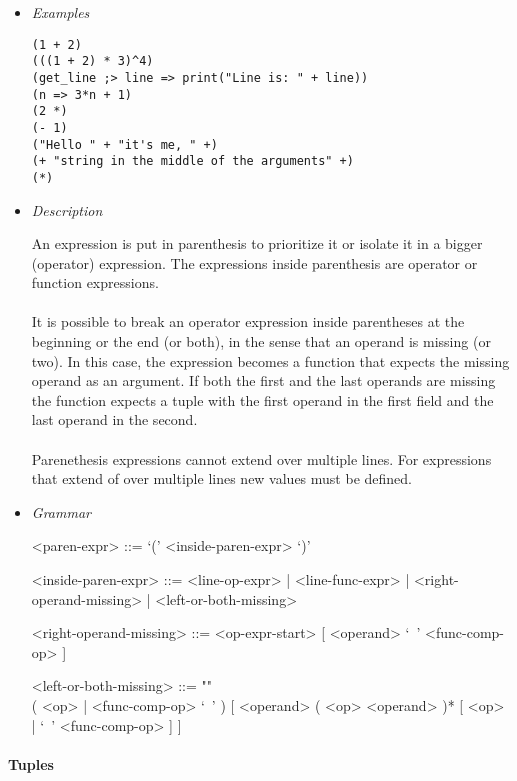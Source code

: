 \documentclass{article}
\begin{document}
\begin{itemize}

\item \textit{Examples}
\begin{verbatim}
(1 + 2)
(((1 + 2) * 3)^4)
(get_line ;> line => print("Line is: " + line))
(n => 3*n + 1)
(2 *)
(- 1)
("Hello " + "it's me, " +)
(+ "string in the middle of the arguments" +)
(*)
\end{verbatim}

\item \textit{Description}

An expression is put in parenthesis to prioritize it or isolate it in a bigger
(operator) expression. The expressions inside parenthesis are operator
or function expressions.
\\\\
It is possible to break an operator expression inside parentheses at the
beginning or the end (or both), in the sense that an operand is missing (or
two). In this case, the expression becomes a function that expects the missing
operand as an argument. If both the first and the last operands are missing 
the function expects a tuple with the first operand in the first field
and the last operand in the second.
\\\\
Parenethesis expressions cannot extend over multiple lines. For expressions
that extend of over multiple lines new values must be defined.

\item \textit{Grammar}
\begin{grammar}
<paren-expr> ::= `(' <inside-paren-expr> `)'  

<inside-paren-expr> ::= 
<line-op-expr> | <line-func-expr> | <right-operand-missing> | <left-or-both-missing>

<right-operand-missing> ::= <op-expr-start> [ <operand> `\ ' <func-comp-op> ]

<left-or-both-missing> ::= ""\\
( <op> | <func-comp-op> `\ ' )
[ <operand> ( <op> <operand> )* [ <op> | `\ ' <func-comp-op> ] ]
\end{grammar}

\end{itemize}

\paragraph{Tuples}
\end{document}
